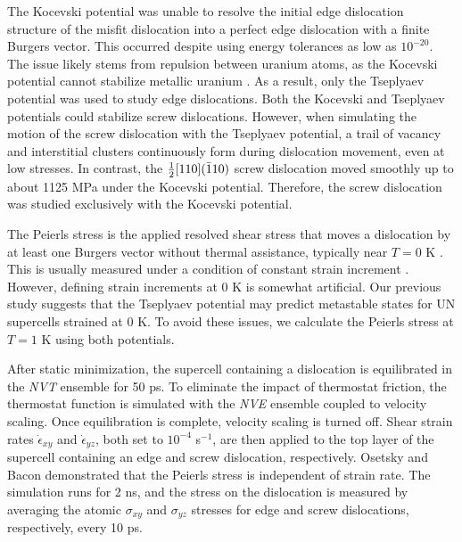 \documentclass[applsci,article,submit,pdftex,moreauthors]{Definitions/mdpi}
\newcommand{\?}{\stackrel{?}{=}}
\begin{document}
The Kocevski potential was unable to resolve the initial edge dislocation structure of the misfit dislocation into a perfect edge dislocation with a finite Burgers vector. This occurred despite using energy tolerances as low as $10^{-20}$. The issue likely stems from repulsion between uranium atoms, as the Kocevski potential cannot stabilize metallic uranium \cite{AbdulHameed2024}. As a result, only the Tseplyaev potential was used to study edge dislocations. Both the Kocevski and Tseplyaev potentials could stabilize screw dislocations. However, when simulating the motion of the screw dislocation with the Tseplyaev potential, a trail of vacancy and interstitial clusters continuously form during dislocation movement, even at low stresses. In contrast, the $\frac{1}{2} [110] ( \Bar{1} 1 0 )$ screw dislocation moved smoothly up to about 1125 MPa under the Kocevski potential. Therefore, the screw dislocation was studied exclusively with the Kocevski potential.

The Peierls stress is the applied resolved shear stress that moves a dislocation by at least one Burgers vector without thermal assistance, typically near $T = 0$ K \cite{Hull2011}. This is usually measured under a condition of constant strain increment \cite{Puls1976, Osetsky2003}. However, defining strain increments at 0 K is somewhat artificial. Our previous study \cite{AbdulHameed2024} suggests that the Tseplyaev potential may predict metastable states for UN supercells strained at 0 K. To avoid these issues, we calculate the Peierls stress at $T = 1$ K using both potentials.

After static minimization, the supercell containing a dislocation is equilibrated in the \textit{NVT} ensemble for 50 ps. To eliminate the impact of thermostat friction, the thermostat function is simulated with the \textit{NVE} ensemble coupled to velocity scaling. Once equilibration is complete, velocity scaling is turned off. Shear strain rates $\Dot{\epsilon}_{xy}$ and $\Dot{\epsilon}_{yz}$, both set to $10^{-4}$ s$^{-1}$, are then applied to the top layer of the supercell containing an edge and screw dislocation, respectively. Osetsky and Bacon \cite{Osetsky2003} demonstrated that the Peierls stress is independent of strain rate. The simulation runs for 2 ns, and the stress on the dislocation is measured by averaging the atomic $\sigma_{xy}$ and $\sigma_{yz}$ stresses for edge and screw dislocations, respectively, every 10 ps.
\end{document}
